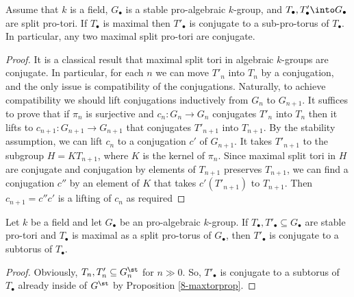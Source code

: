\documentclass[10pt]{../fichiers-configuration-latex/smfart}
\begin{document}
\begin{proposition2}\label{8-maxtorprop} Assume that $k$
is a field, $G_\bullet$ is a stable pro-algebraic $k$-group,
and $T_\bullet,T'_\bullet\into G_\bullet$ are split pro-tori. If
$T_\bullet$ is maximal then $T'_\bullet$ is conjugate to a
sub-pro-torus of $T_\bullet$. In particular, any two maximal
split pro-tori are conjugate.  \end{proposition2} \begin{proof}
It is a classical result that maximal split tori in algebraic
$k$-groups are conjugate. In particular, for each $n$ we can
move $T'_n$ into $T_n$ by a conjugation, and the only issue
is compatibility of the conjugations. Naturally, to achieve
compatibility we should lift conjugations inductively from $G_n$
to $G_{n+1}$. It suffices to prove that if $\pi_n$ is surjective and
$c_n{\colon}G_n\to G_n$ conjugates $T'_n$ into $T_n$ then it lifts
to $c_{n+1}{\colon}G_{n+1}\to G_{n+1}$ that conjugates $T'_{n+1}$
into $T_{n+1}$. By the stability assumption, we can lift $c_n$
to a conjugation $c'$ of $G_{n+1}$. It takes $T'_{n+1}$ to the
subgroup $H=KT_{n+1}$, where $K$ is the kernel of $\pi_n$. Since
maximal split tori in $H$ are conjugate and conjugation by elements
of $T_{n+1}$ preserves $T_{n+1}$, we can find a conjugation $c''$
by an element of $K$ that takes $c'(T'_{n+1})$ to $T_{n+1}$. Then
$c_{n+1}=c''c'$ is a lifting of $c_n$ as required \end{proof}

\begin{corollary2}\label{8-maxtorcor} Let $k$ be a
field and let $G_\bullet$ be an pro-algebraic $k$-group. If
$T_\bullet,T'_\bullet\subseteq G_\bullet$ are stable pro-tori and $T_\bullet$
is maximal as a split pro-torus of $G_\bullet$, then $T'_\bullet$ is
conjugate to a subtorus of $T_\bullet$.  \end{corollary2} \begin{proof}
Obviously, $T_n,T'_n\subseteq G^\st_n$ for $n\gg 0$. So, $T'_\bullet$
is conjugate to a subtorus of $T_\bullet$ already inside of $G^\st$
by Proposition \ref{8-maxtorprop}.  \end{proof}
\end{document}
